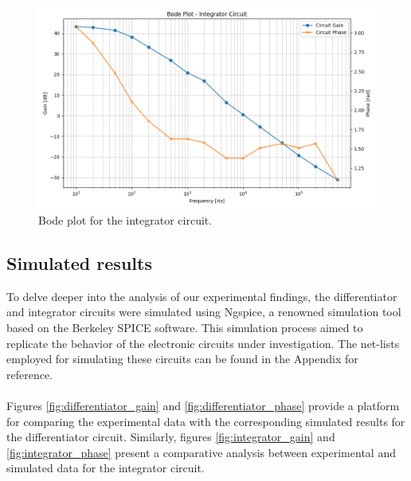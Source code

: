 		\begin{figure}[H]
		    \centering
		    \includegraphics[width=1\textwidth]{figures/integrator/bode_plot.png}
		    \caption{Bode plot for the integrator circuit.}
		    \label{fig:integrator_bode}
		\end{figure}
	
	
	\subsection{Simulated results}
	   
		To delve deeper into the analysis of our experimental findings, the differentiator and integrator circuits were simulated using Ngspice, a renowned simulation tool based on the Berkeley SPICE software. 
		This simulation process aimed to replicate the behavior of the electronic circuits under investigation. 
		The net-lists employed for simulating these circuits can be found in the Appendix for reference. \\\\
		Figures \ref{fig:differentiator_gain} and \ref{fig:differentiator_phase} provide a platform for comparing the experimental data with the corresponding simulated results for the differentiator circuit.
		Similarly, figures \ref{fig:integrator_gain} and \ref{fig:integrator_phase} present a comparative analysis between experimental and simulated data for the integrator circuit. \\
		
